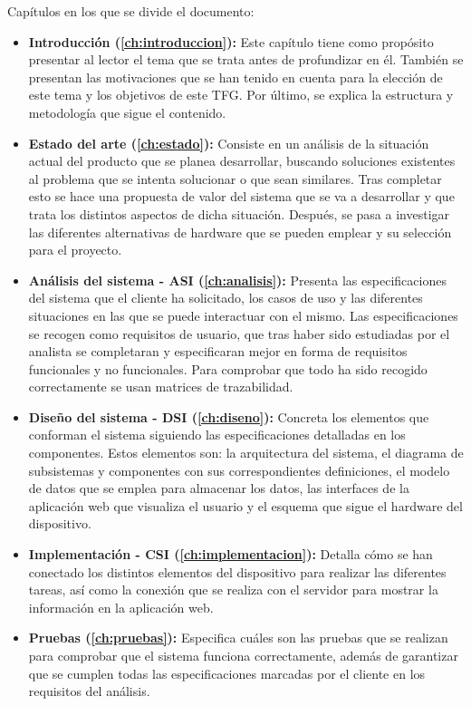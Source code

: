 Capítulos en los que se divide el documento:

\begin{itemize}
	\item \textbf{Introducción (\autoref{ch:introduccion}):} Este capítulo tiene como propósito presentar al lector el tema que se trata antes de profundizar en él. También se presentan las motivaciones que se han tenido en cuenta para la elección de este tema y los objetivos de este TFG. Por último, se explica la estructura y metodología que sigue el contenido.
	\item \textbf{Estado del arte (\autoref{ch:estado}):} Consiste en un análisis de la situación actual del producto que se planea desarrollar, buscando soluciones existentes al problema que se intenta solucionar o que sean similares. Tras completar esto se hace una propuesta de valor del sistema que se va a desarrollar y que trata los distintos aspectos de dicha situación. Después, se pasa a investigar las diferentes alternativas de hardware que se pueden emplear y su selección para el proyecto.
	\item \textbf{Análisis del sistema - ASI (\autoref{ch:analisis}):} Presenta las especificaciones del sistema que el cliente ha solicitado, los casos de uso y las diferentes situaciones en las que se puede interactuar con el mismo. Las especificaciones se recogen como requisitos de usuario, que tras haber sido estudiadas por el analista se completaran y especificaran mejor en forma de requisitos funcionales y no funcionales. Para comprobar que todo ha sido recogido correctamente se usan matrices de trazabilidad.
	\item \textbf{Diseño del sistema - DSI (\autoref{ch:diseno}):} Concreta los elementos que conforman el sistema siguiendo las especificaciones detalladas en los componentes. Estos elementos son: la arquitectura del sistema, el diagrama de subsistemas y componentes con sus correspondientes definiciones, el modelo de datos que se emplea para almacenar los datos, las interfaces de la aplicación web que visualiza el usuario y el esquema que sigue el hardware del dispositivo.
	\item \textbf{Implementación - CSI (\autoref{ch:implementacion}):} Detalla cómo se han conectado los distintos elementos del dispositivo para realizar las diferentes tareas, así como la conexión que se realiza con el servidor para mostrar la información en la aplicación web.
	\item \textbf{Pruebas (\autoref{ch:pruebas}):} Especifica cuáles son las pruebas que se realizan para comprobar que el sistema funciona correctamente, además de garantizar que se cumplen todas las especificaciones marcadas por el cliente en los requisitos del análisis.

\end{itemize}
